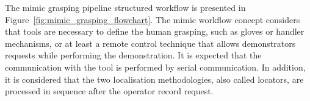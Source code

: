 \begin{figure}[h!]
\end{figure}



The mimic grasping pipeline structured workflow is presented in Figure~\ref{fig:mimic_grasping_flowchart}. The mimic workflow concept considers that tools are necessary to define the human grasping, such as gloves or handler mechanisms, or at least a remote control technique that allows demonstrators requests while performing the demonstration. It is expected that the communication with the tool is performed by serial communication. In addition, it is considered that the two localisation methodologies, also called locators, are processed in sequence after the operator record request. 

